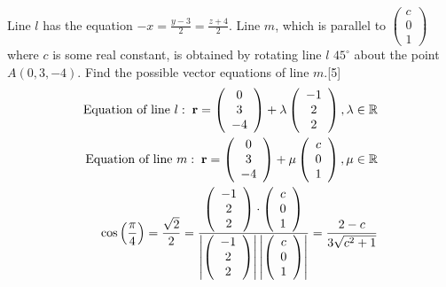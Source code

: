 \documentclass[12pt, a4 paper]{article}
\begin{document}
\begin{outline}[enumerate]
					\1 Line $l$ has the equation $ - x = \frac{{y - 3}}{2} = \frac{{z + 4}}{2}$. Line $m$, which is parallel to $\left( {\begin{array}{*{20}{c}}c\\0\\1\end{array}} \right)$ where $c$ is some real constant, is obtained by rotating line $l$ $45^\circ $ about the point $A(0,3, - 4)$. Find the possible vector equations of line $m$.\hfill[5]
					\color{blue}
					\begin{align*}
						{\textrm{Equation of line }}l:\;{\bf{r}} = \left( {\begin{array}{*{20}{c}}0 \\3\\{ - 4}\end{array}} \right) + \lambda \left( {\begin{array}{*{20}{c}}{ - 1}\\2\\2\end{array}} \right),\lambda  \in \mathbb{R}\\{\textrm{Equation of line }}m:\;{\bf{r}} = \left( {\begin{array}{*{20}{c}}0\\3\\{ - 4}\end{array}} \right) + \mu \left( {\begin{array}{*{20}{c}}c\\0\\1\end{array}} \right),\mu  \in \mathbb{R}\\\cos \left( {\frac{\pi }{4}} \right) = \frac{{\sqrt 2 }}{2} = \frac{{\left( {\begin{array}{*{20}{c}}{ - 1}\\2\\2\end{array}} \right) \cdot \left( {\begin{array}{*{20}{c}}c\\0\\1\end{array}} \right)}}{{\left| {\left( {\begin{array}{*{20}{c}}{ - 1}\\2\\2\end{array}} \right)} \right|\left| {\left( {\begin{array}{*{20}{c}}c\\0\\1\end{array}} \right)} \right|}}= \frac{{2 - c}}{{3\sqrt {{c^2} + 1} }}

\end{align*}
\end{outline}
\end{document}
